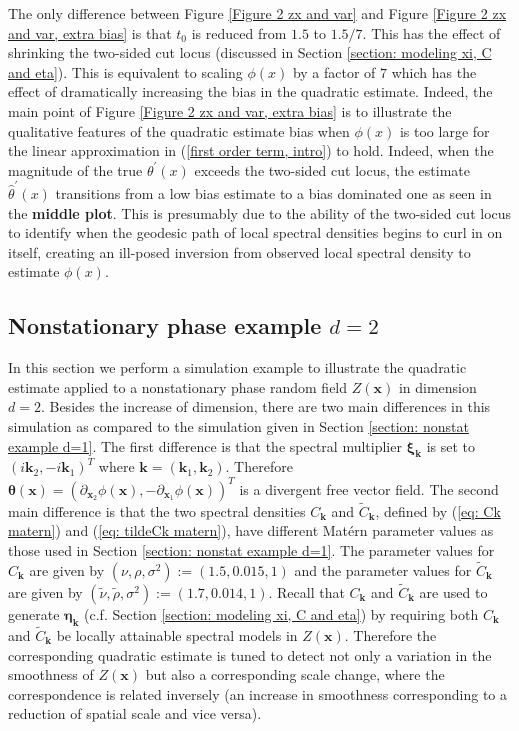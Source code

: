 \documentclass[10pt,noinfoline]{imsart}
\newcommand{\bs}{\boldsymbol}
\begin{document}
The only difference between Figure \ref{Figure 2 zx and var} and Figure \ref{Figure 2 zx and var, extra bias}
is that $t_0$ is reduced from $1.5$ to $1.5/7$. This has the effect of shrinking the two-sided cut locus (discussed in Section \ref{section: modeling xi, C and eta}). This is  equivalent to scaling $\phi(x)$ by a factor of $7$ which has the effect of dramatically increasing the bias in the quadratic estimate. Indeed, the main point of Figure \ref{Figure 2 zx and var, extra bias} is to illustrate the qualitative features of the quadratic estimate bias when $\phi(x)$ is too large for the linear approximation in (\ref{first order term, intro}) to hold. 
Indeed, when the magnitude of the true $\theta^\prime(x)$ exceeds the two-sided cut locus, the estimate $\hat\theta^\prime(x)$ transitions from a low bias estimate to a bias dominated one as seen in the \textbf{middle plot}. This is presumably due to the ability of the two-sided cut locus to identify when the geodesic path of local spectral densities begins to curl in on itself, creating an ill-posed inversion from observed local spectral density to estimate $\phi(x)$.
 




\subsection{Nonstationary phase example $d=2$}
\label{section: nonstat example d=2}


In this section we perform a simulation example to illustrate the quadratic estimate applied to a nonstationary phase random field $Z(\bs x)$ in dimension $d=2$. Besides the increase of dimension, there are two main differences in this simulation as compared to the simulation given in Section \ref{section: nonstat example d=1}. The first difference is that the spectral multiplier $\bs \xi_{\bs k}$ is set to $(i\bs k_2, -i\bs k_1)^T$ where $\bs k = (\bs k_1, \bs k_2)$. Therefore $\bs \theta(\bs x) = (\partial_{\bs x_2}\phi(\bs x), -\partial_{\bs x_1}\phi(\bs x))^T$ is a divergent free vector field. The second main difference is that the two spectral densities $C_{\bs k}$ and $\tilde C_{\bs k}$, defined by (\ref{eq: Ck matern}) and (\ref{eq: tildeCk matern}), have different Mat\'ern parameter values as those used in Section \ref{section: nonstat example d=1}. The parameter values for $C_{\bs k}$  are given by $(\nu, \rho, \sigma^2):=(1.5, 0.015, 1)$ and the parameter values for $\tilde C_{\bs k}$ are given by $(\tilde \nu, \tilde\rho, \sigma^2):=(1.7, 0.014, 1)$. Recall that $C_{\bs k}$ and $\tilde C_{\bs k}$ are used to generate $\bs \eta_{\bs k}$ (c.f. Section \ref{section: modeling xi, C and eta}) by requiring both $C_{\bs k}$ and $\tilde C_{\bs k}$ be locally attainable spectral models in $Z(\bs x)$. Therefore the corresponding quadratic estimate is tuned to detect not only a variation in the smoothness of $Z(\bs x)$ but also a corresponding scale change, where the correspondence is related inversely (an increase in smoothness corresponding to a reduction of spatial scale and vice versa).
\end{document}
